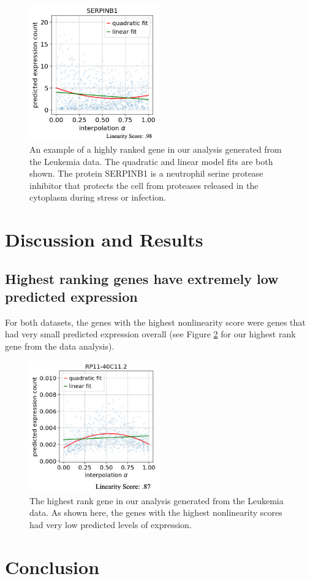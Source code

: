 \documentclass{article}
\begin{document}
\begin{figure}
  \centering
  \includegraphics[width=0.5\textwidth]{SERPINB1.jpg}
  \caption{An example of a highly ranked gene in our analysis generated from the \citet{ferrall-fairbanks_progenitor_2022} Leukemia data.
  The quadratic and linear model fits are both shown.
  The protein SERPINB1 is a neutrophil serine protease inhibitor that protects the cell from proteases released in the cytoplasm during stress or infection.}
  \label{SERPINB1_graph}
\end{figure}

\section{Discussion and Results}


\subsection{Highest ranking genes have extremely low predicted expression}
For both datasets, the genes with the highest nonlinearity score were genes that had very small predicted expression overall (see Figure \ref{RP_gene_plot} for our highest rank gene from the \citet{ferrall-fairbanks_progenitor_2022} data analysis).


\begin{figure}
  \centering
  \includegraphics[width=0.5\textwidth]{RP_gene_plot.jpg}
  \caption{The highest rank gene in our analysis generated from the \citet{ferrall-fairbanks_progenitor_2022} Leukemia data.
  As shown here, the genes with the highest nonlinearity scores had very low predicted levels of expression.}
  \label{RP_gene_plot}
\end{figure}

\section{Conclusion}



{
\small
\printbibliography
}
\end{document}
